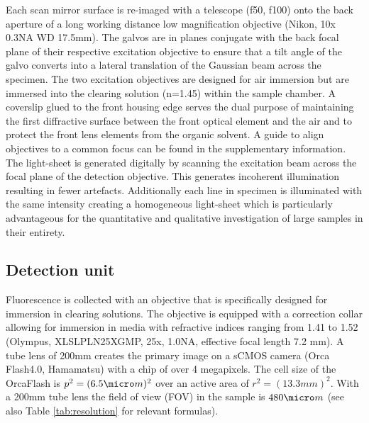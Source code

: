 \documentclass[12pt]{spieman}  %
\begin{document}
Each scan mirror surface is re-imaged with a telescope (f50, f100) onto the back aperture of a long working distance low magnification objective (Nikon, 10x 0.3NA WD 17.5mm).  The galvos are in planes conjugate with the back focal plane of their respective excitation objective to ensure that a tilt angle of the galvo converts into a lateral translation of the Gaussian beam across the specimen. The two excitation objectives are designed for air immersion but are immersed into the clearing solution (n=1.45) within the sample chamber. A coverslip glued to the front housing edge serves the dual purpose of maintaining the first diffractive surface between the front optical element and the air and to protect the front lens elements from the organic solvent. A guide to align objectives to a common focus can be found in the supplementary information. The light-sheet is generated digitally\cite{Keller2008a,Keller2008b} by scanning the excitation beam across the focal plane of the detection objective. This generates incoherent illumination resulting in fewer artefacts. %
Additionally each line in specimen is illuminated with the same intensity creating a homogeneous light-sheet which is particularly advantageous for the quantitative and qualitative investigation of large samples in their entirety.

\subsection{Detection unit}
			
Fluorescence is collected with an objective that is specifically designed for immersion in clearing solutions. The objective is equipped with a correction collar allowing for immersion in media with refractive indices ranging from 1.41 to 1.52 (Olympus, XLSLPLN25XGMP, 25x, 1.0NA, effective focal length 7.2 mm). %
A tube lens of 200mm creates the primary image on a sCMOS camera (Orca Flash4.0, Hamamatsu) with a chip of over 4 megapixels. %
The cell size of the OrcaFlash is $p^2= (6.5\micro m)^2$ over an active area of $r^2= (13.3mm)^2$. With a 200mm tube lens the field of view (FOV) in the sample is $480\micro m$ (see also Table \ref{tab:resolution} for relevant formulas). 
\end{document}
